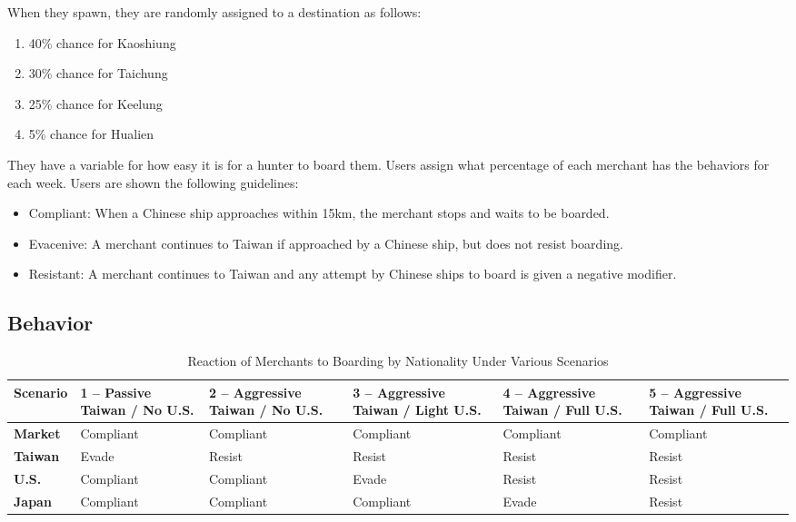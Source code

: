 \documentclass{article}
\begin{document}
    When they spawn, they are randomly assigned to a destination as follows:
    
    \begin{enumerate}
        \item 40\% chance for Kaoshiung
        \item 30\% chance for Taichung
        \item 25\% chance for Keelung
        \item 5\% chance for Hualien
    \end{enumerate}

    They have a variable for how easy it is for a hunter to board them. Users assign what percentage of each merchant has the behaviors for each week. Users are shown the following guidelines:

    \begin{itemize}
        \item Compliant: When a Chinese ship approaches within 15km, the merchant stops and waits to be boarded.
        \item Evacenive: A merchant continues to Taiwan if approached by a Chinese ship, but does not resist boarding.
        \item Resistant: A merchant continues to Taiwan and any attempt by Chinese ships to board is given a negative modifier. 
    \end{itemize}

\subsection{Behavior}
    
    \begin{table}[h!]
        \centering
        \begin{tabularx}{\textwidth}{|l|X|X|X|X|X|}
        \hline
        \textbf{Scenario} & \textbf{1 -- Passive Taiwan / No U.S.} & \textbf{2 -- Aggressive Taiwan / No U.S.} & \textbf{3 -- Aggressive Taiwan / Light U.S.} & \textbf{4 -- Aggressive Taiwan / Full U.S.} & \textbf{5 -- Aggressive Taiwan / Full U.S.} \\
        \hline
        \textbf{Market} & Compliant & Compliant & Compliant & Compliant & Compliant \\
        \hline
        \textbf{Taiwan} & Evade & Resist & Resist & Resist & Resist \\
        \hline
        \textbf{U.S.} & Compliant & Compliant & Evade & Resist & Resist \\
        \hline
        \textbf{Japan} & Compliant & Compliant & Compliant & Evade & Resist \\
        \hline
        \end{tabularx}
        \caption{Reaction of Merchants to Boarding by Nationality Under Various Scenarios}
        \label{table:merchant_behavior_scenarios}
    \end{table}
\end{document}
